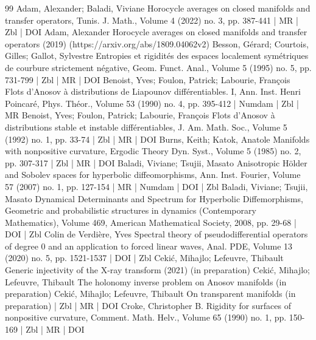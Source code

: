 \documentclass[10pt]{amsart}
\theoremstyle{definition}\newtheorem{defi}[theo]{Definition}\newtheorem{rema}[theo]{Remark}\newtheorem{exam}[theo]{Example}\newtheorem{exem}[theo]{Example}\newtheorem{nota}[theo]{Notation}
\begin{document}



\begin{thebibliography}{99}
Adam, Alexander; Baladi, Viviane Horocycle averages on closed manifolds and transfer operators, Tunis. J. Math., Volume 4 (2022) no. 3, pp. 387-441 | MR | Zbl | DOI
Adam, Alexander Horocycle averages on closed manifolds and transfer operators (2019) (https://arxiv.org/abs/1809.04062v2)
Besson, Gérard; Courtois, Gilles; Gallot, Sylvestre Entropies et rigidités des espaces localement symétriques de courbure strictement négative, Geom. Funct. Anal., Volume 5 (1995) no. 5, pp. 731-799 | Zbl | MR | DOI
Benoist, Yves; Foulon, Patrick; Labourie, François Flots d’Anosov à distributions de Liapounov différentiables. I, Ann. Inst. Henri Poincaré, Phys. Théor., Volume 53 (1990) no. 4, pp. 395-412 | Numdam | Zbl | MR
Benoist, Yves; Foulon, Patrick; Labourie, François Flots d’Anosov à distributions stable et instable différentiables, J. Am. Math. Soc., Volume 5 (1992) no. 1, pp. 33-74 | Zbl | MR | DOI
Burns, Keith; Katok, Anatole Manifolds with nonpositive curvature, Ergodic Theory Dyn. Syst., Volume 5 (1985) no. 2, pp. 307-317 | Zbl | MR | DOI
Baladi, Viviane; Tsujii, Masato Anisotropic Hölder and Sobolev spaces for hyperbolic diffeomorphisms, Ann. Inst. Fourier, Volume 57 (2007) no. 1, pp. 127-154 | MR | Numdam | DOI | Zbl
Baladi, Viviane; Tsujii, Masato Dynamical Determinants and Spectrum for Hyperbolic Diffemorphisms, Geometric and probabilistic structures in dynamics (Contemporary Mathematics), Volume 469, American Mathematical Society, 2008, pp. 29-68 | DOI | Zbl
Colin de Verdière, Yves Spectral theory of pseudodifferential operators of degree 0 and an application to forced linear waves, Anal. PDE, Volume 13 (2020) no. 5, pp. 1521-1537 | DOI | Zbl
Cekić, Mihajlo; Lefeuvre, Thibault Generic injectivity of the X-ray transform (2021) (in preparation)
Cekić, Mihajlo; Lefeuvre, Thibault The holonomy inverse problem on Anosov manifolds (in preparation)
Cekić, Mihajlo; Lefeuvre, Thibault On transparent manifolds (in preparation) | Zbl | MR | DOI
Croke, Christopher B. Rigidity for surfaces of nonpositive curvature, Comment. Math. Helv., Volume 65 (1990) no. 1, pp. 150-169 | Zbl | MR | DOI

\end{thebibliography}
\end{document}
